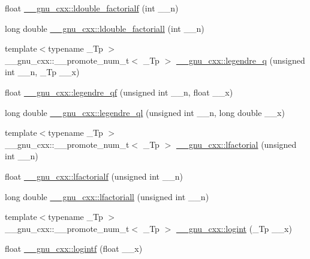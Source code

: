 \begin{DoxyCompactItemize}
\item 
float \hyperlink{group__gnu__math__spec__func_ga33ecc59a7ff139b483cebf42ecd4fe79}{\+\_\+\+\_\+gnu\+\_\+cxx\+::ldouble\+\_\+factorialf} (int \+\_\+\+\_\+n)
\item 
long double \hyperlink{group__gnu__math__spec__func_gae8fa4b4866cfd20349c985b33ed2936e}{\+\_\+\+\_\+gnu\+\_\+cxx\+::ldouble\+\_\+factoriall} (int \+\_\+\+\_\+n)
\item 
{\footnotesize template$<$typename \+\_\+\+Tp $>$ }\\\+\_\+\+\_\+gnu\+\_\+cxx\+::\+\_\+\+\_\+promote\+\_\+num\+\_\+t$<$ \+\_\+\+Tp $>$ \hyperlink{group__gnu__math__spec__func_gac0bb3b5a3229e7b7f80982785ff8f477}{\+\_\+\+\_\+gnu\+\_\+cxx\+::legendre\+\_\+q} (unsigned int \+\_\+\+\_\+n, \+\_\+\+Tp \+\_\+\+\_\+x)
\item 
float \hyperlink{group__gnu__math__spec__func_gaedb2871cec8f0f160524205e9083621d}{\+\_\+\+\_\+gnu\+\_\+cxx\+::legendre\+\_\+qf} (unsigned int \+\_\+\+\_\+n, float \+\_\+\+\_\+x)
\item 
long double \hyperlink{group__gnu__math__spec__func_ga35de372a666b6d530d4b3704ff4a878b}{\+\_\+\+\_\+gnu\+\_\+cxx\+::legendre\+\_\+ql} (unsigned int \+\_\+\+\_\+n, long double \+\_\+\+\_\+x)
\item 
{\footnotesize template$<$typename \+\_\+\+Tp $>$ }\\\+\_\+\+\_\+gnu\+\_\+cxx\+::\+\_\+\+\_\+promote\+\_\+num\+\_\+t$<$ \+\_\+\+Tp $>$ \hyperlink{group__gnu__math__spec__func_ga17b1dc664e1ab95213c340f2453b09e3}{\+\_\+\+\_\+gnu\+\_\+cxx\+::lfactorial} (unsigned int \+\_\+\+\_\+n)
\item 
float \hyperlink{group__gnu__math__spec__func_ga65af05c4093d4895a564a8d67e389a9b}{\+\_\+\+\_\+gnu\+\_\+cxx\+::lfactorialf} (unsigned int \+\_\+\+\_\+n)
\item 
long double \hyperlink{group__gnu__math__spec__func_ga3a0c196f34916dc68c29c89f26cbe1ee}{\+\_\+\+\_\+gnu\+\_\+cxx\+::lfactoriall} (unsigned int \+\_\+\+\_\+n)
\item 
{\footnotesize template$<$typename \+\_\+\+Tp $>$ }\\\+\_\+\+\_\+gnu\+\_\+cxx\+::\+\_\+\+\_\+promote\+\_\+num\+\_\+t$<$ \+\_\+\+Tp $>$ \hyperlink{group__gnu__math__spec__func_ga5c80d417c0fbd41cc9ef0d6f663f9a66}{\+\_\+\+\_\+gnu\+\_\+cxx\+::logint} (\+\_\+\+Tp \+\_\+\+\_\+x)
\item 
float \hyperlink{group__gnu__math__spec__func_gab878da3ba2f5c1d49d96eadde533b233}{\+\_\+\+\_\+gnu\+\_\+cxx\+::logintf} (float \+\_\+\+\_\+x)
\item 

\end{DoxyCompactItemize}
